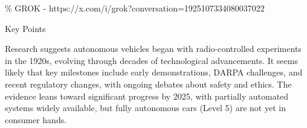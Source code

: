 

\% GROK - https://x.com/i/grok?conversation=1925107334080037022

Key Points

    Research suggests autonomous vehicles began with radio-controlled experiments in the 1920s, evolving through decades of technological advancements.
    It seems likely that key milestones include early demonstrations, DARPA challenges, and recent regulatory changes, with ongoing debates about safety and ethics.
    The evidence leans toward significant progress by 2025, with partially automated systems widely available, but fully autonomous cars (Level 5) are not yet in consumer hands.

